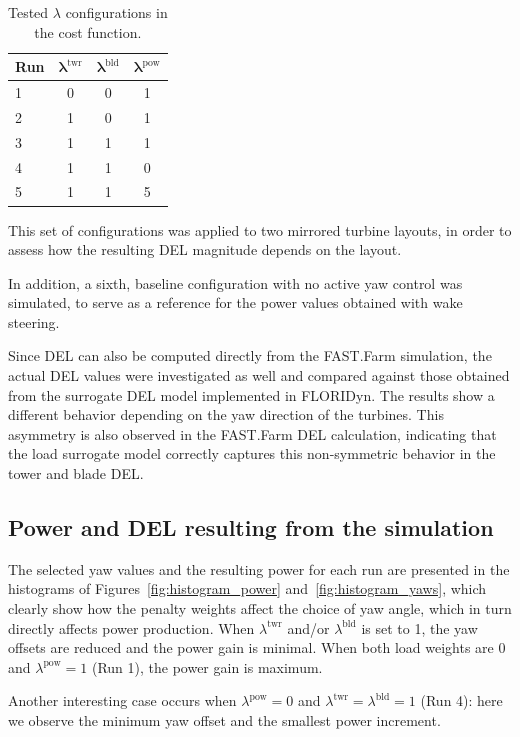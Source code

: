\documentclass[final,5p,times,twocolumn]{elsarticle}
\begin{document}
\begin{table}[h]
\centering
\caption{Tested $\lambda$ configurations in the cost function.}
\label{tab:lambda_configurations}
\begin{tabular}{l | c c c}
\hline
\textbf{Run} & $\boldsymbol{\lambda^{\mathrm{twr}}}$ & $\boldsymbol{\lambda^{\mathrm{bld}}}$ & $\boldsymbol{\lambda^{\mathrm{pow}}}$ \\
\hline
1 & 0 & 0 & 1 \\
2 & 1 & 0 & 1 \\
3 & 1 & 1 & 1 \\
4 & 1 & 1 & 0 \\
5 & 1 & 1 & 5 \\
\hline
\end{tabular}
\end{table}

This set of configurations was applied to two mirrored turbine layouts, in order to assess how the resulting DEL magnitude depends on the layout.

In addition, a sixth, baseline configuration with no active yaw control was simulated, to serve as a reference for the power values obtained with wake steering.

Since DEL can also be computed directly from the FAST.Farm simulation, the actual DEL values were investigated as well and compared against those obtained from the surrogate DEL model implemented in FLORIDyn. The results show a different behavior depending on the yaw direction of the turbines. This asymmetry is also observed in the FAST.Farm DEL calculation, indicating that the load surrogate model correctly captures this non-symmetric behavior in the tower and blade DEL.


\subsection{Power and DEL resulting from the simulation}

The selected yaw values and the resulting power for each run are presented in the histograms of Figures~\ref{fig:histogram_power} and~\ref{fig:histogram_yaws}, which clearly show how the penalty weights affect the choice of yaw angle, which in turn directly affects power production. When $\lambda^{\mathrm{twr}}$ and/or $\lambda^{\mathrm{bld}}$ is set to 1, the yaw offsets are reduced and the power gain is minimal. When both load weights are 0 and $\lambda^{\mathrm{pow}}=1$ (Run 1), the power gain is maximum.

Another interesting case occurs when $\lambda^{\mathrm{pow}}=0$ and $\lambda^{\mathrm{twr}}=\lambda^{\mathrm{bld}}=1$ (Run 4): here we observe the minimum yaw offset and the smallest power increment.
\end{document}
